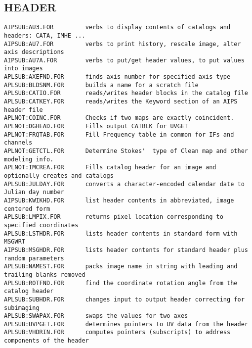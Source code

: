 
\subsection{HEADER}
\begin{verbatim}
AIPSUB:AU3.FOR         verbs to display contents of catalogs and headers: CATA, IMHE ...
AIPSUB:AU7.FOR         verbs to print history, rescale image, alter axis descriptions
AIPSUB:AU7A.FOR        verbs to put/get header values, to put values into images
APLSUB:AXEFND.FOR      finds axis number for specified axis type
APLSUB:BLDSNM.FOR      builds a name for a scratch file
APLSUB:CATIO.FOR       reads/writes header blocks in the catalog file
APLSUB:CATKEY.FOR      reads/writes the Keyword section of an AIPS header file
APLNOT:COINC.FOR       Checks if two maps are exactly coincident.
APLNOT:DGHEAD.FOR      Fills output CATBLK for UVGET
APLNOT:FRQTAB.FOR      Fill Frequency table in common for IFs and channels
APLNOT:GETCTL.FOR      Determine Stokes'  type of Clean map and other modeling info.
APLNOT:IMCREA.FOR      Fills catalog header for an image and optionally creates and catalogs
APLSUB:JULDAY.FOR      converts a character-encoded calendar date to Julian day number
AIPSUB:KWIKHD.FOR      list header contents in abbreviated, image centered form
APLSUB:LMPIX.FOR       returns pixel location corresponding to specified coordinates
APLSUB:LSTHDR.FOR      lists header contents in standard form with MSGWRT
AIPSUB:MSGHDR.FOR      lists header contents for standard header plus random parameters
APLSUB:NAMEST.FOR      packs image name in string with leading and trailing blanks removed
APLSUB:ROTFND.FOR      find the coordinate rotation angle from the catalog header
APLSUB:SUBHDR.FOR      changes input to output header correcting for subimaging
APLSUB:SWAPAX.FOR      swaps the values for two axes
APLSUB:UVPGET.FOR      determines pointers to UV data from the header
APLSUB:VHDRIN.FOR      computes pointers (subscripts) to address components of the header
\end{verbatim}
 
